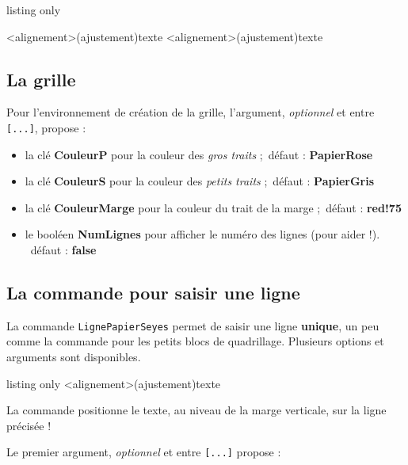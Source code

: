 \documentclass[a4paper]{article}
\newcommand\Cle[1]{{\bfseries\sffamily\textlangle #1\textrangle}}
\begin{document}
\begin{PresentationCode}{listing only}
\begin{PleinePageSeyes}[options]
	\LignePapierSeyes[options]<alignement>(ajustement){texte}
	\ParagraphePapierSeyes[options]<alignement>(ajustement){texte}
\end{PleinePageSeyes}
\end{PresentationCode}

\subsection{La grille}

Pour l'environnement de création de la grille, l'argument, \textit{optionnel} et entre \texttt{[...]}, propose :

\begin{itemize}
	\item la clé \Cle{CouleurP} pour la couleur des \textit{gros traits} ;\hfill~défaut : \Cle{PapierRose}
	\item la clé \Cle{CouleurS} pour la couleur des \textit{petits traits} ;\hfill~défaut : \Cle{PapierGris}
	\item la clé \Cle{CouleurMarge} pour la couleur du trait de la marge ;\hfill~défaut : \Cle{red!75}
	\item le booléen \Cle{NumLignes} pour afficher le numéro des lignes (pour aider !). \hfill~défaut : \Cle{false}
\end{itemize}

\subsection{La commande pour saisir une ligne}

La commande \texttt{LignePapierSeyes} permet de saisir une ligne \textbf{unique}, un peu comme la commande pour les petits blocs de quadrillage. Plusieurs options et arguments sont disponibles.

\begin{PresentationCode}{listing only}
\LignePapierSeyes[options]<alignement>(ajustement){texte}
\end{PresentationCode}

La commande positionne le \textsf{texte}, au niveau de la marge verticale, sur la ligne précisée !

\smallskip

Le premier argument, \textit{optionnel} et entre \texttt{[...]} propose :
\end{document}
